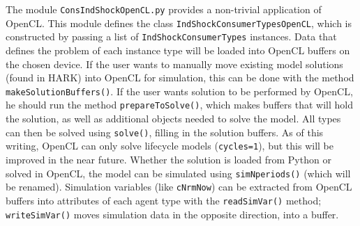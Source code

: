 \documentclass[12pt,pdftex,letterpaper]{article}
\begin{document}
The module \texttt{ConsIndShockOpenCL.py} provides a non-trivial application of OpenCL.  This module defines the class \texttt{IndShockConsumerTypesOpenCL}, which is constructed by passing a list of \texttt{IndShockConsumerTypes} instances.  Data that defines the problem of each instance type will be loaded into OpenCL buffers on the chosen device.  If the user wants to manually move existing model solutions (found in HARK) into OpenCL for simulation, this can be done with the method \texttt{makeSolutionBuffers()}.  If the user wants solution to be performed by OpenCL, he should run the method \texttt{prepareToSolve()}, which makes buffers that will hold the solution, as well as additional objects needed to solve the model.  All types can then be solved using \texttt{solve()}, filling in the solution buffers.  As of this writing, OpenCL can only solve lifecycle models (\texttt{cycles=1}), but this will be improved in the near future.  Whether the solution is loaded from Python or solved in OpenCL, the model can be simulated using \texttt{simNperiods()} (which will be renamed).  Simulation variables (like \texttt{cNrmNow}) can be extracted from OpenCL buffers into attributes of each agent type with the \texttt{readSimVar()} method; \texttt{writeSimVar()} moves simulation data in the opposite direction, into a buffer.
\end{document}
